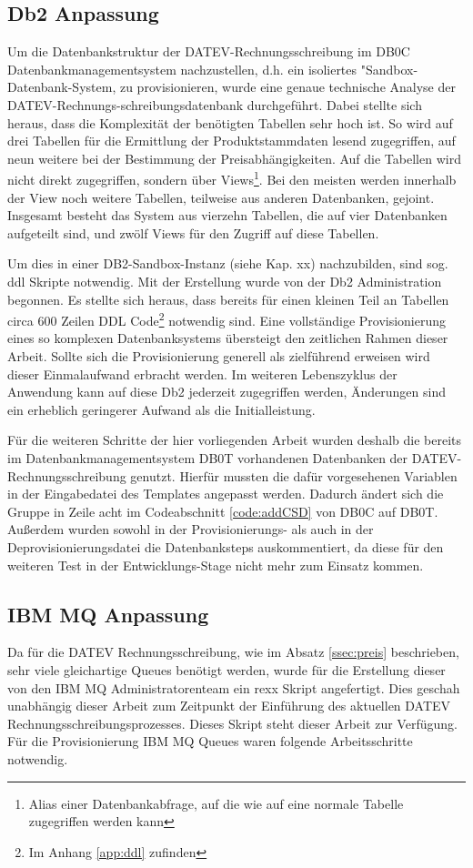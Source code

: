 \subsection{Db2 Anpassung}\label{ssec:db2entw}
Um die Datenbankstruktur der DATEV-Rechnungsschreibung im DB0C Datenbankmanagementsystem nachzustellen, d.h. ein isoliertes "Sandbox-Datenbank-System, zu provisionieren, wurde eine genaue technische Analyse der DATEV-Rechnungs-schreibungsdatenbank durchgeführt.
Dabei stellte sich heraus, dass die Komplexität der benötigten Tabellen sehr hoch ist.
So wird auf drei Tabellen für die Ermittlung der Produktstammdaten lesend zugegriffen, auf neun weitere bei der Bestimmung der Preisabhängigkeiten.
Auf die Tabellen wird nicht direkt zugegriffen, sondern über Views\footnote{Alias einer Datenbankabfrage, auf die wie auf eine normale Tabelle zugegriffen werden kann}.
Bei den meisten werden innerhalb der View noch weitere Tabellen, teilweise aus anderen Datenbanken, gejoint.
Insgesamt besteht das System aus vierzehn Tabellen, die auf vier Datenbanken aufgeteilt sind, und zwölf Views für den Zugriff auf diese Tabellen.

Um dies in einer DB2-Sandbox-Instanz (siehe Kap. xx) nachzubilden, sind sog. \Gls{ddl} Skripte notwendig. Mit der Erstellung wurde von der Db2 Administration begonnen.
Es stellte sich heraus, dass bereits für einen kleinen Teil an Tabellen circa 600 Zeilen DDL Code\footnote{Im Anhang \ref{app:ddl} zufinden} notwendig sind.
Eine vollständige Provisionierung eines so komplexen Datenbanksystems übersteigt den zeitlichen Rahmen dieser Arbeit.
Sollte sich die Provisionierung generell als zielführend erweisen wird dieser Einmalaufwand erbracht werden.
Im weiteren Lebenszyklus der Anwendung kann auf diese Db2 jederzeit zugegriffen werden, Änderungen sind ein erheblich geringerer Aufwand als die Initialleistung.

Für die weiteren Schritte der hier vorliegenden Arbeit wurden deshalb die bereits im Datenbankmanagementsystem DB0T vorhandenen Datenbanken der DATEV-Rechnungsschreibung genutzt.
Hierfür mussten die dafür vorgesehenen Variablen in der Eingabedatei des Templates angepasst werden.
Dadurch ändert sich die Gruppe in Zeile acht im Codeabschnitt \ref{code:addCSD} von \glqq DB0C\grqq{} auf \glqq DB0T\grqq.
Außerdem wurden sowohl in der Provisionierungs- als auch in der Deprovisionierungsdatei die Datenbanksteps auskommentiert, da diese für den weiteren Test in der Entwicklungs-Stage nicht mehr zum Einsatz kommen.

\subsection{IBM MQ Anpassung}\label{ssec:mqentw}
Da für die DATEV Rechnungsschreibung, wie im Absatz \ref{ssec:preis} beschrieben, sehr viele gleichartige Queues benötigt werden, wurde für die Erstellung dieser von den IBM MQ Administratorenteam ein \Gls{rexx} Skript angefertigt.
Dies geschah unabhängig dieser Arbeit zum Zeitpunkt der Einführung des aktuellen DATEV Rechnungsschreibungsprozesses.
Dieses Skript steht dieser Arbeit zur Verfügung.
Für die Provisionierung IBM MQ Queues waren folgende Arbeitsschritte notwendig.


